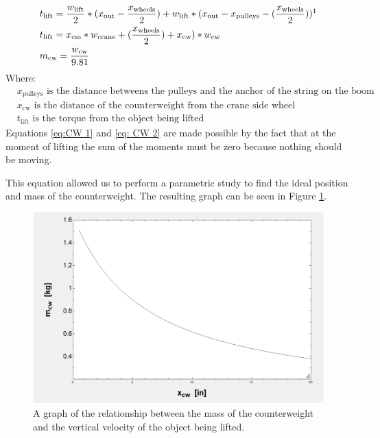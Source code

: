 \documentclass[letterpaper, 12pt]{article}
\begin{document}
\begin{align}
& t_{\text{lift}}= \frac{w_\text{lift}}{2}*(x_{\text{out}}-\frac{x_{\text{wheels}}}{2})+ w_{\text{lift}}*(x_\text{out}-x_{\text{pulleys}}-(\frac{x_{\text{wheels}}}{2})) \footnotemark \label{eq:CW 1} \\ 
& t_{\text{lift}} = x_{\text{cm}} * w_{\text{crane}} +   (\frac{x_{\text{wheels}}}{2}) + x_{\text{cw}}) * w_{\text{cw}} \label{eq: CW 2} \\
& m_{\text{cw}} = \frac{w_{\text{cw}}}{9.81}
\end{align}
Where:
\begin{equation}
 \begin{split}
    & x_{\text{pulleys}}  \text{ is the distance betweens the pulleys and the anchor of the string on the boom } \\
    & x_{\text{cw}}  \text{ is the distance of the counterweight from the crane side wheel} \\
    & t_{\text{lift}} \text{ is the torque from the object being lifted}
 \end{split}
\end{equation}
Equations \ref{eq:CW 1} and \ref{eq: CW 2} are made possible by the fact that at the moment of lifting the sum of the moments must be zero because nothing should be moving.

This equation allowed us to perform a parametric study to find the ideal position and mass of the counterweight. The resulting graph can be seen in Figure \ref{fig:Counter Weight.png}.
\begin{figure}[H]
    \centering
    \includegraphics[width =.55\linewidth]{Counter Weight.png}
    \caption{A graph of the relationship between the mass of the counterweight and the vertical velocity of the object being lifted.}
    \label{fig:Counter Weight.png}
\end{figure}
\end{document}
